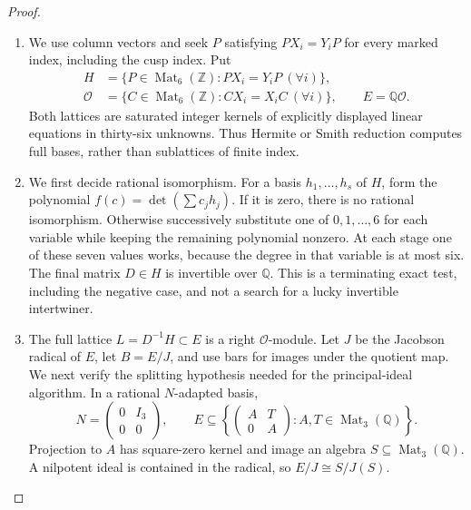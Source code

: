 \documentclass[11pt,a4paper]{article}
\theoremstyle{definition}
\begin{document}
\begin{proof}
\begin{enumerate}[label=\arabic*.]
\item We use column vectors and seek $P$ satisfying $PX_i=Y_iP$ for every
marked index, including the cusp index. Put
\[
\begin{aligned}
 H&=\{P\in\operatorname{Mat}_6(\mathbb Z):PX_i=Y_iP\ (\forall i)\},\\
 \mathcal O&=\{C\in\operatorname{Mat}_6(\mathbb Z):CX_i=X_iC\ (\forall i)\},
 \qquad E=\mathbb Q\mathcal O.
\end{aligned}                                                    \tag{F.IC1}\label{maps:eq:F.IC1}
\]
Both lattices are saturated integer kernels of explicitly displayed
linear equations in thirty-six unknowns. Thus Hermite or Smith
reduction computes full bases, rather than sublattices of finite index.

\item We first decide rational isomorphism. For a basis $h_1,\ldots,h_s$ of
$H$, form the polynomial $f(c)=\det(\sum c_jh_j)$. If it is zero,
there is no rational isomorphism. Otherwise successively substitute
one of $0,1,\ldots,6$ for each variable while keeping the remaining
polynomial nonzero. At each stage one of these seven values works,
because the degree in that variable is at most six. The final matrix
$D\in H$ is invertible over $\mathbb Q$. This is a terminating exact
test, including the negative case, and not a search for a lucky
invertible intertwiner.

\item The full lattice $L=D^{-1}H\subset E$ is a right $\mathcal O$-module.
Let $J$ be the Jacobson radical of $E$, let $B=E/J$, and use bars
for images under the quotient map. We next verify the splitting
hypothesis needed for the principal-ideal algorithm. In a rational
$N$-adapted basis,
\[
 N=\begin{pmatrix}0&I_3\\0&0\end{pmatrix},\qquad
 E\subseteq
 \left\{\begin{pmatrix}A&T\\0&A\end{pmatrix}:A,T\in
                                      \operatorname{Mat}_3(\mathbb Q)\right\}.
                                                               \tag{F.IC2}\label{maps:eq:F.IC2}
\]
Projection to $A$ has square-zero kernel and image an algebra
$S\subseteq\operatorname{Mat}_3(\mathbb Q)$. A nilpotent ideal is
contained in the radical, so $E/J\cong S/J(S)$.


\end{enumerate}
\end{proof}
\end{document}
